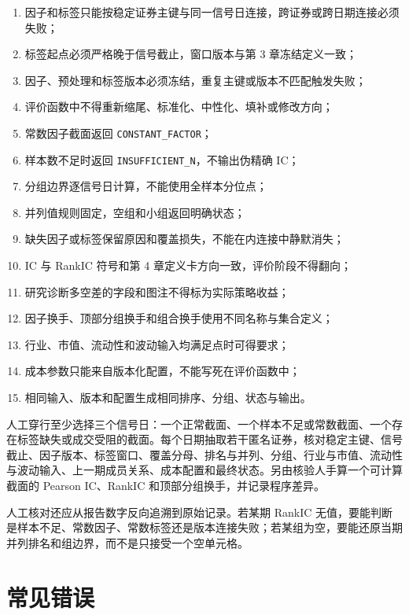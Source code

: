 \begin{enumerate}
  \item 因子和标签只能按稳定证券主键与同一信号日连接，跨证券或跨日期连接必须失败；
  \item 标签起点必须严格晚于信号截止，窗口版本与第 3 章冻结定义一致；
  \item 因子、预处理和标签版本必须冻结，重复主键或版本不匹配触发失败；
  \item 评价函数中不得重新缩尾、标准化、中性化、填补或修改方向；
  \item 常数因子截面返回 \texttt{CONSTANT\_FACTOR}；
  \item 样本数不足时返回 \texttt{INSUFFICIENT\_N}，不输出伪精确 IC；
  \item 分组边界逐信号日计算，不能使用全样本分位点；
  \item 并列值规则固定，空组和小组返回明确状态；
  \item 缺失因子或标签保留原因和覆盖损失，不能在内连接中静默消失；
  \item IC 与 RankIC 符号和第 4 章定义卡方向一致，评价阶段不得翻向；
  \item 研究诊断多空差的字段和图注不得标为实际策略收益；
  \item 因子换手、顶部分组换手和组合换手使用不同名称与集合定义；
  \item 行业、市值、流动性和波动输入均满足点时可得要求；
  \item 成本参数只能来自版本化配置，不能写死在评价函数中；
  \item 相同输入、版本和配置生成相同排序、分组、状态与输出。
\end{enumerate}

\begin{practicebox}
人工穿行至少选择三个信号日：一个正常截面、一个样本不足或常数截面、一个存在标签缺失或成交受阻的截面。每个日期抽取若干匿名证券，核对稳定主键、信号截止、因子版本、标签窗口、覆盖分母、排名与并列、分组、行业与市值、流动性与波动输入、上一期成员关系、成本配置和最终状态。另由核验人手算一个可计算截面的 Pearson IC、RankIC 和顶部分组换手，并记录程序差异。
\end{practicebox}

人工核对还应从报告数字反向追溯到原始记录。若某期 RankIC 无值，要能判断是样本不足、常数因子、常数标签还是版本连接失败；若某组为空，要能还原当期并列排名和组边界，而不是只接受一个空单元格。

\section{常见错误}

